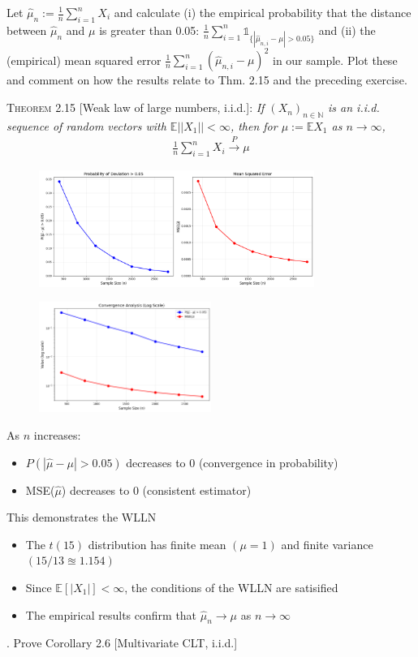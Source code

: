 \documentclass[10pt]{article}
\begin{document}
Let $\hat{\mu}_n := \frac{1}{n}\sum_{i = 1}^{n}X_i $ and calculate (i) the empirical probability that the distance between $\hat{\mu}_n $ and $\mu $ is greater than 0.05: $\frac{1}{n}\sum_{i = 1}^{n}\mathbb{1}_{\{{|\hat{\mu}_{n, i} - \mu| > 0.05\}}}$ and (ii) the (empirical) mean squared error $\frac{1}{n}\sum_{i = 1}^{n}(\hat{\mu}_{n, i} - \mu)^2 $ in our sample. Plot these and comment on how the results relate to Thm. 2.15 and the preceding exercise.

\textsc{Theorem 2.15} [Weak law of large numbers, i.i.d.]: \textit{If $(X_n)_{n\in \mathbb{N}}$ is an i.i.d. sequence of random vectors with $\mathbb{E}||X_1|| < \infty $, then for $\mu := \mathbb{E}X_1 $ as $n \to \infty $,}
\begin{gather*}
    \frac{1}{n}\sum_{i = 1}^{n}X_i \xrightarrow{P}\mu
\end{gather*}

\begin{figure}[h]
    \centering
    \includegraphics[width=0.8\textwidth]{plot1.png}
    \label{fig:simulation}
\end{figure}
\begin{figure}[h]
    \centering
    \includegraphics[width=0.5\textwidth]{plot2.png}
    \label{fig:simulation}
\end{figure}
As $n $ increases: 
\begin{itemize}
    \item $P(|\hat{\mu} - \mu| > 0.05) $ decreases to 0 (convergence in probability)
    \item MSE($\hat{\mu}$) decreases to 0 (consistent estimator)
\end{itemize}
This demonstrates the WLLN
\begin{itemize}
    \item The $t(15)$ distribution has finite mean $(\mu = 1)$ and finite variance $(15 / 13 \approxeq 1.154) $
    \item Since $\mathbb{E}[|X_1|] < \infty $, the conditions of the WLLN are satisified
    \item The empirical results confirm that $\hat{\mu}_n \to \mu $ as $n \to \infty $
\end{itemize}
. Prove Corollary 2.6 [Multivariate CLT, i.i.d.]
\end{document}
